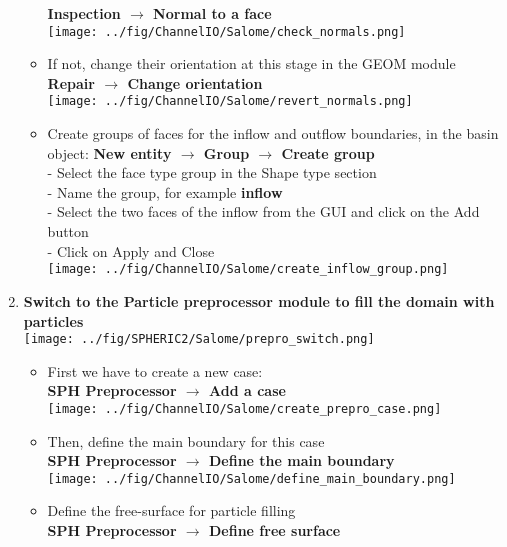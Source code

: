 \documentclass{../GPUSPHtemplate}
\begin{document}
\begin{enumerate}
\begin{itemize}
    \textbf{Inspection $\to$ Normal to a face}\smallskip\\
    \texttt{[image: ../fig/ChannelIO/Salome/check\_normals.png]}
  \item If not, change their orientation at this stage in the GEOM module\\
    \textbf{Repair $\to$ Change orientation}\smallskip\\
    \texttt{[image: ../fig/ChannelIO/Salome/revert\_normals.png]}
  \item Create groups of faces for the inflow and outflow boundaries, in the basin object:
    \textbf{New entity $\to$ Group $\to$ Create group}\smallskip\\
    - Select the face type group in the Shape type section\\
    - Name the group, for example \textbf{inflow}\\
    - Select the two faces of the inflow from the GUI and click on the Add button\\
    - Click on Apply and Close\\
    \texttt{[image: ../fig/ChannelIO/Salome/create\_inflow\_group.png]}
  \end{itemize}
\item \textbf{Switch to the Particle preprocessor module to fill the domain with particles}\smallskip\\
  \texttt{[image: ../fig/SPHERIC2/Salome/prepro\_switch.png]}
  \begin{itemize}
  \item First we have to create a new case:\\
    \textbf{SPH Preprocessor $\to$ Add a case}\smallskip\\
    \texttt{[image: ../fig/ChannelIO/Salome/create\_prepro\_case.png]}
  \item Then, define the main boundary for this case\\
    \textbf{SPH Preprocessor $\to$ Define the main boundary}\smallskip\\
    \texttt{[image: ../fig/ChannelIO/Salome/define\_main\_boundary.png]}
  \item Define the free-surface for particle filling\\
    \textbf{SPH Preprocessor $\to$ Define free surface}\smallskip\\

\end{itemize}
\end{enumerate}
\end{document}
